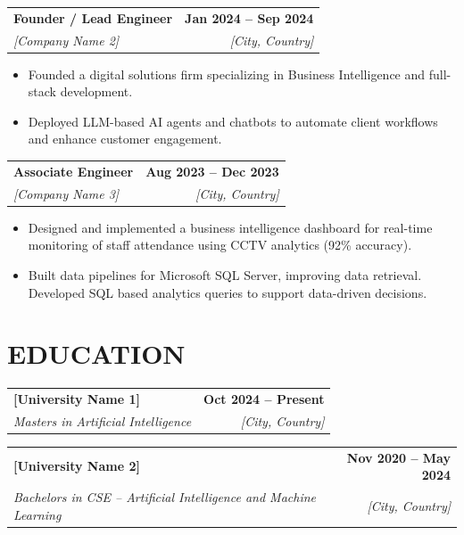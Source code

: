 \documentclass[a4paper,11pt]{article}
\makeatletter
\newcommand{\entryheader}[4]{%
  \begin{tabularx}{\textwidth}{@{}>{\RaggedRight\arraybackslash}X r@{}}
    \textbf{#1} & \textbf{#2} \\
    \textit{#3} & \textit{#4} \\
  \end{tabularx}%
}
\newenvironment{entrybullets}{%
  \begin{minipage}[t]{0.77\textwidth}
    \begin{itemize}[leftmargin=*,label=\textbullet,align=left]
}{%
    \end{itemize}
  \end{minipage}
}
\makeatother
\begin{document}
\vspace{0.25cm}
\entryheader{Founder / Lead Engineer}{Jan 2024 -- Sep 2024}{[Company Name 2]}{[City, Country]}
\begin{entrybullets}
  \item Founded a digital solutions firm specializing in Business Intelligence and full-stack development.
  \item Deployed LLM-based AI agents and chatbots to automate client workflows and enhance customer engagement.
\end{entrybullets}

\vspace{0.25cm}
\entryheader{Associate Engineer}{Aug 2023 -- Dec 2023}{[Company Name 3]}{[City, Country]}
\begin{entrybullets}
  \item Designed and implemented a business intelligence dashboard for real-time monitoring of staff attendance using CCTV analytics (92\% accuracy).
  \item Built data pipelines for Microsoft SQL Server, improving data retrieval. Developed SQL based analytics queries to support data-driven decisions.
\end{entrybullets}

\section*{EDUCATION}
\begin{tabularx}{\textwidth}{@{}X r@{}}
  \textbf{[University Name 1]} & \textbf{Oct 2024 -- Present} \\
  \textit{Masters in Artificial Intelligence} & \textit{[City, Country]} \\
\end{tabularx}

\vspace{0.25cm}
\begin{tabularx}{\textwidth}{@{}X r@{}}
  \textbf{[University Name 2]} & \textbf{Nov 2020 -- May 2024} \\
  \textit{Bachelors in CSE -- Artificial Intelligence and Machine Learning} & \textit{[City, Country]} \\
\end{tabularx}

\end{document}
